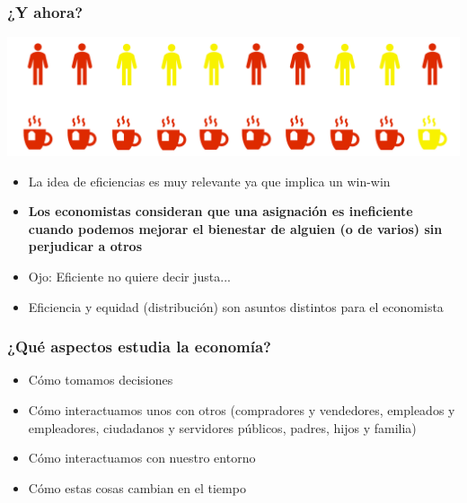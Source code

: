 \documentclass{beamer}
\begin{document}
\begin{frame}
\frametitle{¿Y ahora?}
    \begin{center}
        \includegraphics[scale=0.55]{../Figures/Tazon3.png}
    \end{center}
    \begin{itemize}
        \small
        \item La idea de eficiencias es muy relevante ya que implica un win-win
        \item \textbf{Los economistas consideran que una asignación es ineficiente cuando podemos mejorar el bienestar de alguien (o de varios) sin perjudicar a otros}
        \item Ojo: Eficiente no quiere decir justa...
        \item Eficiencia y equidad (distribución) son asuntos distintos para el economista
    \end{itemize}
\end{frame}

\begin{frame}
\frametitle{¿Qué aspectos estudia la economía?}
\begin{itemize}
    \item Cómo tomamos decisiones  \vspace{2mm}
    \item Cómo interactuamos unos con otros (compradores y vendedores, empleados y empleadores, ciudadanos y servidores públicos, padres, hijos y familia) \vspace{2mm}
    \item Cómo interactuamos con nuestro entorno \vspace{2mm}
    \item Cómo estas cosas cambian en el tiempo  
\end{itemize}
\end{frame}
\end{document}

